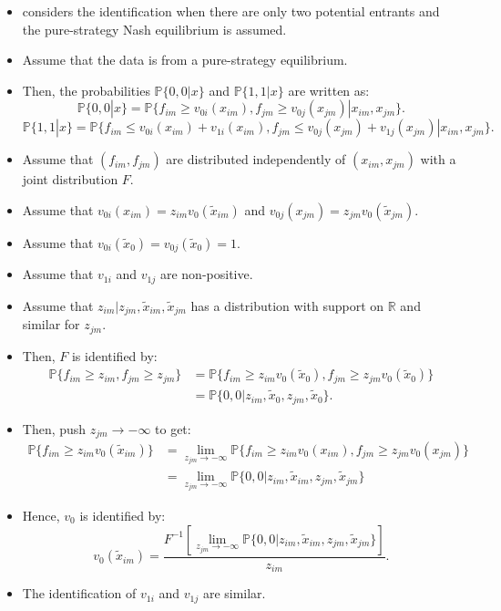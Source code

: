 \documentclass[]{book}
\begin{document}
\begin{itemize}
\item
  \citet{tamerIncompleteSimultaneousDiscrete2003} considers the
  identification when there are only two potential entrants and the
  pure-strategy Nash equilibrium is assumed.
\item
  Assume that the data is from a pure-strategy equilibrium.
\item
  Then, the probabilities \(\mathbb{P}\{0, 0|x\}\) and
  \(\mathbb{P}\{1, 1|x\}\) are written as: \[
  \mathbb{P}\{0, 0|x\} = \mathbb{P}\{f_{im} \ge v_{0i}(x_{im}), f_{jm} \ge v_{0j}(x_{jm})|x_{im}, x_{jm}\}.
  \] \[
  \mathbb{P}\{1, 1|x\} = \mathbb{P}\{f_{im} \le v_{0i}(x_{im}) + v_{1i}(x_{im}), f_{jm} \le v_{0j}(x_{jm}) + v_{1j}(x_{jm})|x_{im}, x_{jm}\}.
  \]
\item
  Assume that \((f_{im}, f_{jm})\) are distributed independently of
  \((x_{im}, x_{jm})\) with a joint distribution \(F\).
\item
  Assume that \(v_{0i}(x_{im}) = z_{im} v_0(\tilde{x}_{im})\) and
  \(v_{0j}(x_{jm}) = z_{jm} v_0(\tilde{x}_{jm})\).
\item
  Assume that \(v_{0i}(\tilde{x}_0) = v_{0j}(\tilde{x}_0) = 1\).
\item
  Assume that \(v_{1i}\) and \(v_{1j}\) are non-positive.
\item
  Assume that \(z_{im}| z_{jm}, \tilde{x}_{im}, \tilde{x}_{jm}\) has a
  distribution with support on \(\mathbb{R}\) and similar for
  \(z_{jm}\).
\item
  Then, \(F\) is identified by: \[
  \begin{split}
  \mathbb{P}\{f_{im} \ge z_{im}, f_{jm} \ge z_{jm}\} &= \mathbb{P}\{ f_{im} \ge z_{im} v_0(\tilde{x}_{0}), f_{jm} \ge z_{jm} v_0(\tilde{x}_{0})\}\\
  &= \mathbb{P}\{0, 0|z_{im}, \tilde{x}_0, z_{jm}, \tilde{x}_0\}.
  \end{split}
  \]
\item
  Then, push \(z_{jm} \to - \infty\) to get: \[
  \begin{split}
  \mathbb{P}\{f_{im} \ge z_{im} v_0(\tilde{x}_{im})\} &= \lim_{z_{jm} \to - \infty} \mathbb{P}\{f_{im} \ge z_{im} v_0(x_{im}), f_{jm} \ge z_{jm} v_0(x_{jm})\}\\
  &= \lim_{z_{jm} \to - \infty} \mathbb{P}\{0, 0|z_{im}, \tilde{x}_{im}, z_{jm}, \tilde{x}_{jm}\}
  \end{split}
  \]
\item
  Hence, \(v_{0}\) is identified by: \[
  v_0(\tilde{x}_{im}) = \frac{F^{-1}[\lim_{z_{jm} \to - \infty} \mathbb{P}\{0, 0|z_{im}, \tilde{x}_{im}, z_{jm}, \tilde{x}_{jm}\}]}{z_{im}}.
  \]
\item
  The identification of \(v_{1i}\) and \(v_{1j}\) are similar.
\end{itemize}
\end{document}
